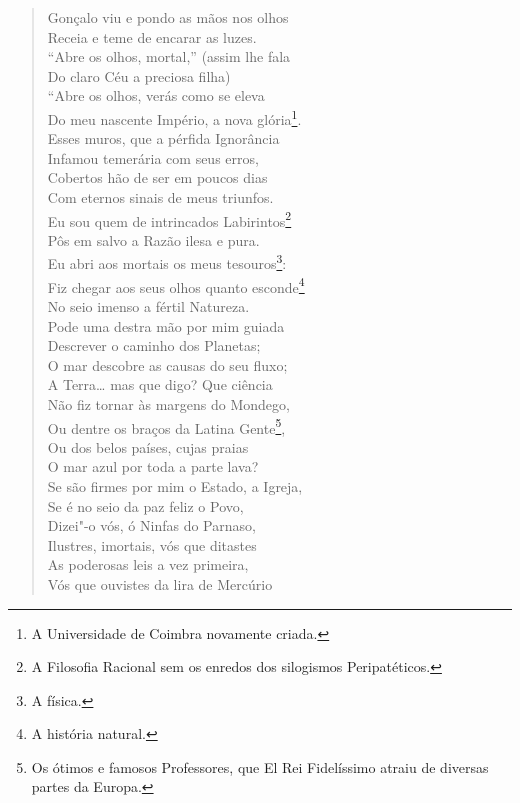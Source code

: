 \begin{verse}
Gonçalo viu e pondo as mãos nos olhos\\
Receia e teme de encarar as luzes.\\
``Abre os olhos, mortal,'' (assim lhe fala\\
Do claro Céu a preciosa filha)\\
``Abre os olhos, verás como se eleva\\
Do meu nascente Império, a nova glória\footnote{ A Universidade de Coimbra novamente criada.}.\\
Esses muros, que a pérfida Ignorância\\			\index{\Ignor}
Infamou temerária com seus erros,\\
Cobertos hão de ser em poucos dias\\
Com eternos sinais de meus triunfos.\\
Eu sou quem de intrincados Labirintos\footnote{ A Filosofia Racional
sem os enredos dos silogismos Peripatéticos.}\\	\index{\Perip}
Pôs em salvo a Razão ilesa e pura.\\		\index{\Fisic}
Eu abri aos mortais os 
meus tesouros\footnote{ A física.}:\\	\index{\Fisic}
Fiz chegar aos seus olhos quanto esconde\footnote{ A história natural.}\\		\index{\Fisic}
No seio imenso a fértil Natureza.\\
Pode uma destra mão por mim guiada\\
Descrever o caminho dos Planetas;\\
O mar descobre as causas do seu fluxo;\\
A Terra\ldots{} mas que digo? Que ciência\\
Não fiz tornar às margens do Mondego,\\		\index{\Monde}
Ou dentre os braços da Latina Gente\footnote{ Os ótimos e famosos
Professores, que El Rei Fidelíssimo atraiu de diversas partes da Europa.},\\
Ou dos belos países, cujas praias\\
O mar azul por toda a parte lava?\\
Se são firmes por mim o Estado, a Igreja,\\
Se é no seio da paz feliz o Povo,\\
Dizei"-o vós, ó Ninfas do Parnaso,\\
Ilustres, imortais, vós que ditastes\\
As poderosas leis a vez primeira,\\
Vós que ouvistes da lira de Mercúrio\\

\end{verse}
